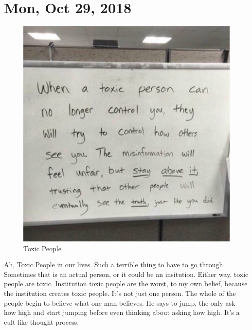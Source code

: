 \section{Mon, Oct 29, 2018}

\begin{figure}[h!]
  \centering
  \includegraphics[width=.5\linewidth]{2018/images/toxic.jpg}
  \caption{Toxic People}
  \label{fig:rabbit}
\end{figure}

Ah, Toxic People in our lives. Such a terrible thing to have to go through. Sometimes
that is an actual person, or it could be an insitution. Either way, toxic people are
toxic. Institution toxic people are the worst, to my own belief, because the
institution creates toxic people. It's not just one person. The whole of the people
begin to believe what one man believes. He says to jump, the only ask how high and
start jumping before even thinking about asking how high. It's a cult like thought
process.
